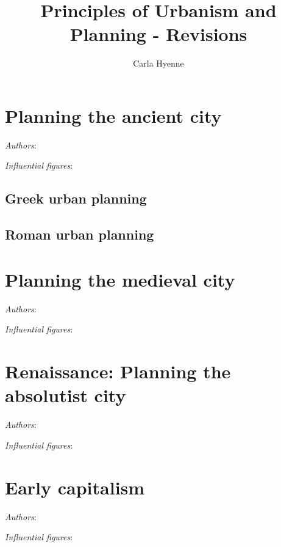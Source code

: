 \documentclass{article}
\title{Principles of Urbanism and Planning - Revisions}
\author{Carla Hyenne}
\begin{document}
\maketitle

\tableofcontents

\pagebreak

\section{Planning the ancient city}
\textit{Authors}:

\textit{Influential figures}:

\subsection{Greek urban planning}

\subsection{Roman urban planning}

\section{Planning the medieval city}
\textit{Authors}:

\textit{Influential figures}:


\section{Renaissance: Planning the absolutist city}

\textit{Authors}:

\textit{Influential figures}:

\section{Early capitalism}

\textit{Authors}:

\textit{Influential figures}:

\end{document}
